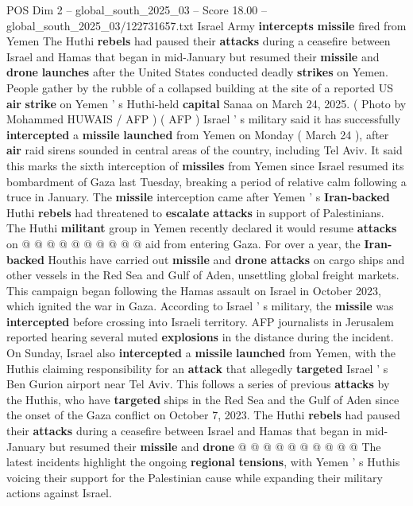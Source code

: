 \begin{textsample}{POS Dim 2 – global\_south\_2025\_03 – Score 18.00 – global\_south\_2025\_03/122731657.txt}  \label{ex:f2_pos_286}
Israel Army \textbf{intercepts} \textbf{missile} fired from Yemen The Huthi \textbf{rebels} had paused their \textbf{attacks} during a ceasefire between Israel and Hamas that began in mid-January but resumed their \textbf{missile} and \textbf{drone} \textbf{launches} after the United States conducted deadly \textbf{strikes} on Yemen.
People gather by the rubble of a collapsed building at the site of a reported US \textbf{air} \textbf{strike} on Yemen ' s Huthi-held \textbf{capital} Sanaa on March 24, 2025. ( Photo by Mohammed HUWAIS / AFP ) ( AFP ) Israel ' s military said it has successfully \textbf{intercepted} a \textbf{missile} \textbf{launched} from Yemen on Monday ( March 24 ), after \textbf{air} raid sirens sounded in central areas of the country, including Tel Aviv.
It said this marks the sixth interception of \textbf{missiles} from Yemen since Israel resumed its bombardment of Gaza last Tuesday, breaking a period of relative calm following a truce in January.
The \textbf{missile} interception came after Yemen ' s \textbf{Iran-backed} Huthi \textbf{rebels} had threatened to \textbf{escalate} \textbf{attacks} in support of Palestinians.
The Huthi \textbf{militant} group in Yemen recently declared it would resume \textbf{attacks} on @ @ @ @ @ @ @ @ @ @ aid from entering Gaza.
For over a year, the \textbf{Iran-backed} Houthis have carried out \textbf{missile} and \textbf{drone} \textbf{attacks} on cargo ships and other vessels in the Red Sea and Gulf of Aden, unsettling global freight markets.
This campaign began following the Hamas assault on Israel in October 2023, which ignited the war in Gaza.
According to Israel ' s military, the \textbf{missile} was \textbf{intercepted} before crossing into Israeli territory.
AFP journalists in Jerusalem reported hearing several muted \textbf{explosions} in the distance during the incident.
On Sunday, Israel also \textbf{intercepted} a \textbf{missile} \textbf{launched} from Yemen, with the Huthis claiming responsibility for an \textbf{attack} that allegedly \textbf{targeted} Israel ' s Ben Gurion airport near Tel Aviv.
This follows a series of previous \textbf{attacks} by the Huthis, who have \textbf{targeted} ships in the Red Sea and the Gulf of Aden since the onset of the Gaza conflict on October 7, 2023.
The Huthi \textbf{rebels} had paused their \textbf{attacks} during a ceasefire between Israel and Hamas that began in mid-January but resumed their \textbf{missile} and \textbf{drone} @ @ @ @ @ @ @ @ @ @ The latest incidents highlight the ongoing \textbf{regional} \textbf{tensions}, with Yemen ' s Huthis voicing their support for the Palestinian cause while expanding their military actions against Israel.

\end{textsample}
